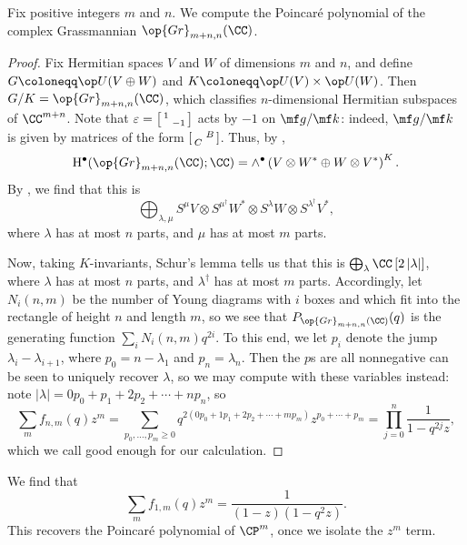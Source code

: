 \documentclass[../notes.tex]{subfiles}
\begin{document}
\begin{exe}
	Fix positive integers $m$ and $n$. We compute the Poincar\'e polynomial of the complex Grassmannian $\op{Gr}_{m+n,n}(\CC)$.
\end{exe}
\begin{proof}
	Fix Hermitian spaces $V$ and $W$ of dimensions $m$ and $n$, and define $G\coloneqq\op U(V\oplus W)$ and $K\coloneqq\op U(V)\times\op U(W)$. Then $G/K=\op{Gr}_{m+n,n}(\CC)$, which classifies $n$-dimensional Hermitian subspaces of $\CC^{m+n}$. Note that $\varepsilon=\begin{bsmallmatrix}
		1 \\ & -1
	\end{bsmallmatrix}$ acts by $-1$ on $\mf g/\mf k$: indeed, $\mf g/\mf k$ is given by matrices of the form $\begin{bsmallmatrix}
		& B \\ C
	\end{bsmallmatrix}$. Thus, by ,
	\[\mathrm H^\bullet(\op{Gr}_{m+n,n}(\CC);\CC)=\land^\bullet\left(V\otimes W^*\oplus W\otimes V^*\right)^{K}.\]
	By , we find that this is
	\[\bigoplus_{\lambda,\mu}S^\mu V\otimes S^{\mu^\dagger}W^*\otimes S^\lambda W\otimes S^{\lambda^\dagger}V^*,\]
	where $\lambda$ has at most $n$ parts, and $\mu$ has at most $m$ parts.
	
	Now, taking $K$-invariants, Schur's lemma tells us that this is $\bigoplus_\lambda\CC\left[2\left|\lambda\right|\right]$, where $\lambda$ has at most $n$ parts, and $\lambda^\dagger$ has at most $m$ parts. Accordingly, let $N_i(n,m)$ be the number of Young diagrams with $i$ boxes and which fit into the rectangle of height $n$ and length $m$, so we see that $P_{\op{Gr}_{m+n,n}(\CC)}(q)$ is the generating function $\sum_iN_i(n,m)q^{2i}$. To this end, we let $p_i$ denote the jump $\lambda_i-\lambda_{i+1}$, where $p_0=n-\lambda_1$ and $p_n=\lambda_n$. Then the $p$s are all nonnegative can be seen to uniquely recover $\lambda$, so we may compute with these variables instead: note $\left|\lambda\right|=0p_0+p_1+2p_2+\cdots+np_n$, so
	\[\sum_mf_{n,m}(q)z^m=\sum_{p_0,\ldots,p_m\ge0}q^{2(0p_0+1p_1+2p_2+\cdots+mp_m)}z^{p_0+\cdots+p_m}=\prod_{j=0}^n\frac1{1-q^{2j}z},\]
	which we call good enough for our calculation.
\end{proof}
\begin{example}
	We find that
	\[\sum_mf_{1,m}(q)z^m=\frac1{(1-z)\left(1-q^2z\right)}.\]
	This recovers the Poincar\'e polynomial of $\CP^m$, once we isolate the $z^m$ term.
\end{example}
\end{document}
